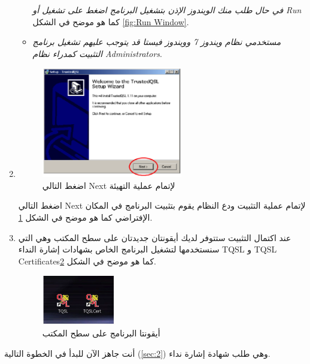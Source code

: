 \documentclass[a4paper,12pt]{article}
\begin{document}
\begin{enumerate}
\begin{itemize}
					\emph{في حال طلب منك الويندوز الإذن بتشغيل البرنامج اضغط على تشغيل
			أو \textenglish{Run}} كما هو موضح في الشكل \ref{fig:Run Window}.
				\item
					\emph{مستخدمي نظام ويندوز 7 وويندوز فيستا قد يتوجب عليهم تشغيل
			برنامج التثبيت كمدراء نظام \textenglish{Administrators}}.
			\end{itemize}
\clearpage
		\item
			\begin{figure}[!hbtp]
			\centering
			\includegraphics[width=0.58\textwidth]{installation-steps.eps}
			\caption{اضغط التالي Next لإتمام عملية التهيئة}
			\label{fig:Next}
			\end{figure}
			اضغط التالي \textenglish{Next} لإتمام عملية التثبيت ودع النظام يقوم بتثبيت البرنامج
		في المكان الإفتراضي كما هو موضح في الشكل \ref{fig:Next}.
		\item
			عند اكتمال التثبيت ستتوفر لديك أيقونتان جديدتان على سطح المكتب وهي
		التي سنستخدمها لتشغيل البرنامج الخاص بشهادات إشارة النداء \textenglish{TQSL} و \textenglish{TQSL Certificates}كما هو موضح في الشكل \ref{fig:Desktop}.
		
			\begin{figure}[!hbtp]
			\centering
			\includegraphics[width=0.3\textwidth]{desktop-icons.eps}
			\caption{أيقونتا البرنامج على سطح المكتب}
			\label{fig:Desktop}
			\end{figure}
		
	\end{enumerate}

أنت جاهز الآن للبدأ في الخطوة التالية (\ref{sec:2}) وهي طلب شهادة إشارة نداء.

\vspace{24pt}
\begin{center}
	\color{slategray2}
{\Huge\hrulefill\hspace{0.2cm} \floweroneright\floweroneleft \hspace{0.2cm} \hrulefill}
\end{center}
\newpage
\end{document}
